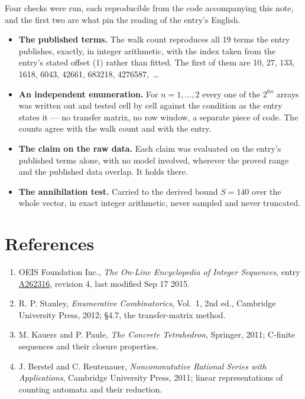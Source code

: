 \documentclass[11pt]{article}
\theoremstyle{definition}
\begin{document}
Four checks were run, each reproducible from the code accompanying this note, and the first two are what pin the reading of the entry's English.

\begin{itemize}

\item {\bfseries The published terms.} The walk count reproduces all 19 terms the entry publishes, exactly, in integer arithmetic, with the index taken from the entry's stated offset (1) rather than fitted. The first of them are 10, 27, 133, 1618, 6043, 42661, 683218, 4276587,~\dots

\item {\bfseries An independent enumeration.} For $n = 1,\dots,2$ every one of the $2^{6n}$ arrays was written out and tested cell by cell against the condition as the entry states it --- no transfer matrix, no row window, a separate piece of code. The counts agree with the walk count and with the entry.

\item {\bfseries The claim on the raw data.} Each claim was evaluated on the entry's published terms alone, with no model involved, wherever the proved range and the published data overlap. It holds there.

\item {\bfseries The annihilation test.} Carried to the derived bound $S = 140$ over the whole vector, in exact integer arithmetic, never sampled and never truncated.

\end{itemize}

\section{References}

\begin{enumerate}

\item OEIS Foundation Inc., \emph{The On-Line Encyclopedia of Integer Sequences}, entry \href{https://oeis.org/A262316}{A262316}, revision 4, last modified Sep 17 2015.

\item R. P. Stanley, \emph{Enumerative Combinatorics}, Vol.~1, 2nd ed., Cambridge University Press, 2012; \S4.7, the transfer-matrix method.

\item M. Kauers and P. Paule, \emph{The Concrete Tetrahedron}, Springer, 2011; C-finite sequences and their closure properties.

\item J. Berstel and C. Reutenauer, \emph{Noncommutative Rational Series with Applications}, Cambridge University Press, 2011; linear representations of counting automata and their reduction.

\end{enumerate}
\end{document}
